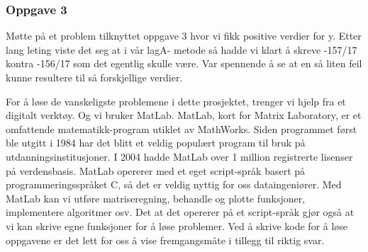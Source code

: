 \subsubsection{Oppgave 3}
Møtte på et problem tilknyttet oppgave 3 hvor vi fikk positive verdier for y. Etter lang leting viste det seg at i vår lagA- metode så hadde vi klart å skreve -157/17 kontra -156/17 som det egentlig skulle være. Var spennende å se at en så liten feil kunne resultere til så forskjellige verdier. 

For å løse de vanskeligste problemene i dette prosjektet, trenger vi hjelp fra et digitalt verktøy. Og vi bruker MatLab. MatLab, kort for Matrix Laboratory, er et omfattende matematikk-program utiklet av MathWorks. Siden programmet først ble utgitt i 1984 har det blitt et veldig populært program til bruk på utdanningsinstitusjoner. I 2004 hadde MatLab over 1 million registrerte lisenser på verdensbasis.
MatLab opererer med et eget script-språk basert på programmeringsspråket C, så det er veldig nyttig for oss dataingeniører. Med MatLab kan vi utføre matriseregning, behandle og plotte funksjoner, implementere algoritmer osv. Det at det opererer på et script-språk gjør også at vi kan skrive egne funksjoner for å løse problemer. Ved å skrive kode for å løse oppgavene er det lett for oss å vise fremgangsmåte i tillegg til riktig svar.
